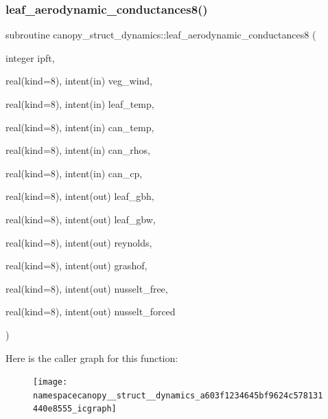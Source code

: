 \subsubsection{\texorpdfstring{leaf\+\_\+aerodynamic\+\_\+conductances8()}{leaf\_aerodynamic\_conductances8()}}
{\footnotesize\ttfamily subroutine canopy\+\_\+struct\+\_\+dynamics\+::leaf\+\_\+aerodynamic\+\_\+conductances8 (\begin{DoxyParamCaption}\item[{integer}]{ipft,  }\item[{real(kind=8), intent(in)}]{veg\+\_\+wind,  }\item[{real(kind=8), intent(in)}]{leaf\+\_\+temp,  }\item[{real(kind=8), intent(in)}]{can\+\_\+temp,  }\item[{real(kind=8), intent(in)}]{can\+\_\+rhos,  }\item[{real(kind=8), intent(in)}]{can\+\_\+cp,  }\item[{real(kind=8), intent(out)}]{leaf\+\_\+gbh,  }\item[{real(kind=8), intent(out)}]{leaf\+\_\+gbw,  }\item[{real(kind=8), intent(out)}]{reynolds,  }\item[{real(kind=8), intent(out)}]{grashof,  }\item[{real(kind=8), intent(out)}]{nusselt\+\_\+free,  }\item[{real(kind=8), intent(out)}]{nusselt\+\_\+forced }\end{DoxyParamCaption})}

Here is the caller graph for this function\+:
\nopagebreak
\begin{figure}[H]
\begin{center}
\leavevmode
\texttt{[image: namespacecanopy\_\_struct\_\_dynamics\_a603f1234645bf9624c578131440e8555\_icgraph]}
\end{center}
\end{figure}
\mbox{\label{namespacecanopy__struct__dynamics_ae5504447c798d15053109bc4f8ff9346}} 
